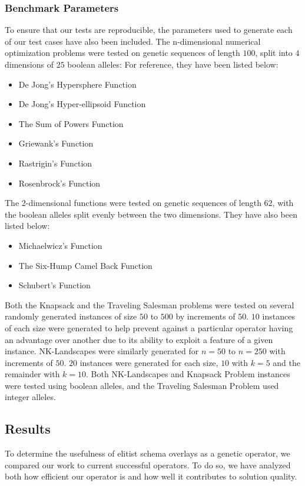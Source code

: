 \subsubsection*{Benchmark Parameters}
To ensure that our tests are reproducible, the parameters used to generate each of our test cases have also been included. The n-dimensional numerical optimization problems were tested on genetic sequences of length $100$, split into $4$ dimensions of $25$ boolean alleles: For reference, they have been listed below:

\begin{itemize}
\item De Jong's Hypersphere Function
\item De Jong's Hyper-ellipsoid Function
\item The Sum of Powers Function
\item Griewank's Function
\item Rastrigin's Function
\item Rosenbrock's Function
\end{itemize} 

The 2-dimensional functions were tested on genetic sequences of length $62$, with the boolean alleles split evenly between the two dimensions. They have also been listed below:

\begin{itemize}
\item Michaelwicz's Function
\item The Six-Hump Camel Back Function
\item Schubert's Function
\end{itemize}

Both the Knapsack and the Traveling Salesman problems were tested on several randomly generated instances of size $50$ to $500$ by increments of $50$. $10$ instances of each size were generated to help prevent against a particular operator having an advantage over another due to its ability to exploit a feature of a given instance. NK-Landscapes were similarly generated for $n = 50$ to $n = 250$ with increments of $50$. $20$ instances were generated for each size, $10$ with $k = 5$ and the remainder with $k = 10$. Both NK-Landscapes and Knapsack Problem instances were tested using boolean alleles, and the Traveling Salesman Problem used integer alleles.

\subsection*{Results}
To determine the usefulness of elitist schema overlays as a genetic operator, we compared our work to current successful operators. To do so, we have analyzed both how efficient our operator is and how well it contributes to solution quality. 

